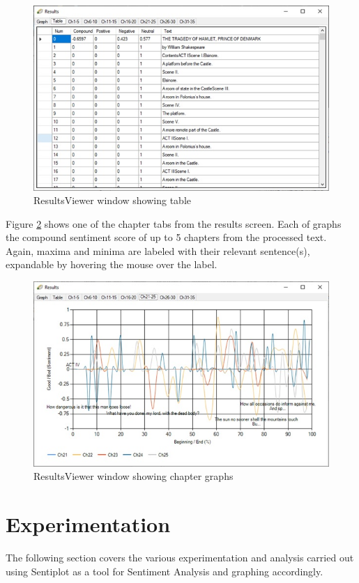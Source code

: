 \documentclass{article}
\begin{document}
        \begin{figure}[H]
            \includegraphics[width=1\textwidth]{Misc/resultstable}
            \caption{ResultsViewer window showing table}
            \label{fig:resultstable}
        \end{figure}
        Figure \ref{fig:resultschapters} shows one of the chapter tabs from the results screen. Each of graphs the compound sentiment score of up to 5 chapters from the processed text. Again, maxima and minima are labeled with their relevant sentence(s), expandable by hovering the mouse over the label.
        \begin{figure}[H]
            \includegraphics[width=1\textwidth]{Misc/resultschapters}
            \caption{ResultsViewer window showing chapter graphs}
            \label{fig:resultschapters}
        \end{figure}
\newpage
\section{Experimentation}
The following section covers the various experimentation and analysis carried out using Sentiplot as a tool for Sentiment Analysis and graphing accordingly.
\end{document}
